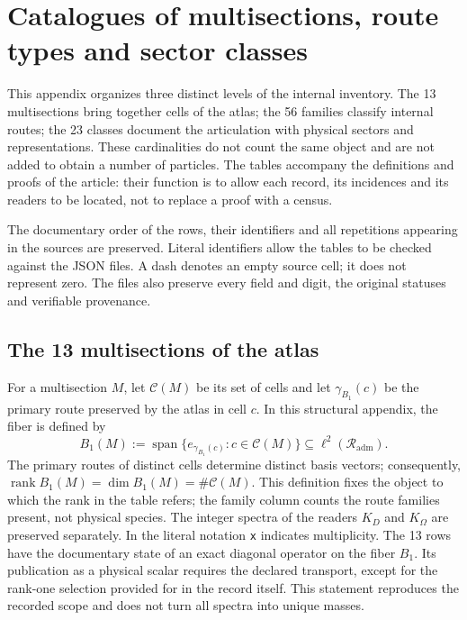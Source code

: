 \clearpage
\section{Catalogues of multisections, route types and sector classes}
\label{vi:sec:vi-catalogos-estructurales}

This appendix organizes three distinct levels of the internal inventory. The
13 multisections bring together cells of the atlas; the 56 families classify internal
routes; the 23 classes document the articulation with physical sectors and
representations. These cardinalities do not count the same object and
are not added to obtain a number of particles. The tables accompany the
definitions and proofs of the article: their function is to allow each
record, its incidences and its readers to be located, not to replace a proof with a census.

The documentary order of the rows, their identifiers and all repetitions
appearing in the sources are preserved. Literal identifiers allow the tables
to be checked against the JSON files. A dash denotes an empty source cell;
it does not represent zero. The files also preserve every field and digit,
the original statuses and verifiable provenance.
\CatalogRouteReference

\subsection{The 13 multisections of the atlas}

For a multisection \(M\), let \(\mathcal C(M)\) be its set of cells and
let \(\gamma_{B_1}(c)\) be the primary route preserved by the atlas in cell
\(c\). In this structural appendix, the fiber is defined by
\[
 B_1(M):=
 \operatorname{span}\bigl\{e_{\gamma_{B_1}(c)}:c\in\mathcal C(M)\bigr\}
 \subseteq \ell^2(\mathcal R_{\mathrm{adm}}).
\]
The primary routes of distinct cells determine distinct basis vectors;
consequently,
\(\operatorname{rank}B_1(M)=\dim B_1(M)=\#\mathcal C(M)\).
This definition fixes the object to which the rank in the table refers; the
family column counts the
route families present, not physical species. The integer spectra
of the readers \(K_D\) and \(K_\Omega\) are preserved separately.
In the literal notation \texttt{x} indicates multiplicity. The 13 rows have
the documentary state of an exact diagonal operator on the fiber \(B_1\).
Its publication as a physical scalar requires the declared transport, except for
the rank-one selection provided for in the record itself. This statement
reproduces the recorded scope and does not turn all spectra into unique masses.

